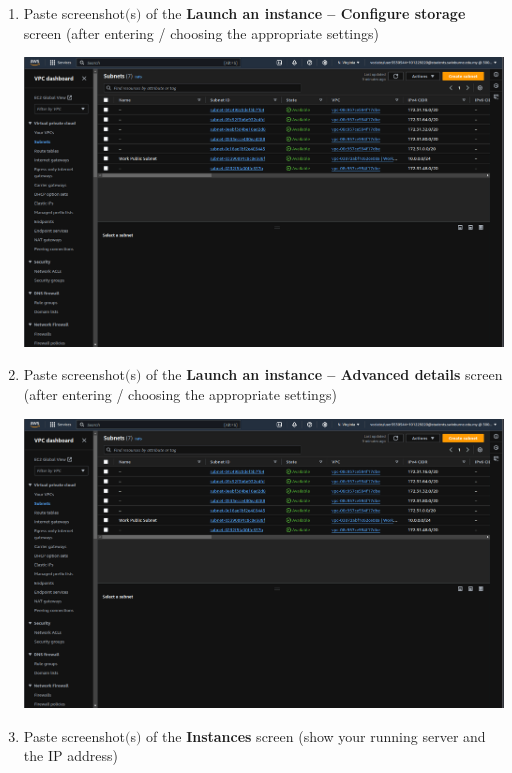 \documentclass[11pt]{article}
\begin{document}
\begin{enumerate}[resume]
    \item Paste screenshot$($s$)$ of the \textbf{Launch an instance – Configure storage} screen (after entering / choosing the appropriate settings) \\
    \vspace{5mm}

    {\centering
    \includegraphics[width=5.8in]{pics/4.png}
    }



    \item Paste screenshot$($s$)$ of the \textbf{Launch an instance – Advanced details} screen (after entering / choosing the appropriate settings) \\
    \vspace{5mm}

    {\centering
    \includegraphics[width=5.8in]{pics/4.png}
    }



    \item Paste screenshot$($s$)$ of the \textbf{Instances} screen (show your running server and the IP address) \\
    \vspace{5mm}


\end{enumerate}
\end{document}

